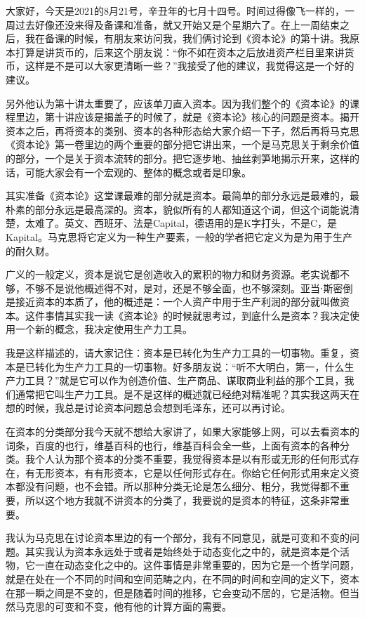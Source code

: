 \documentclass[UTF8, 12pt, a4paper]{ctexrep}
\begin{document}
大家好，今天是2021的8月21号，辛丑年的七月十四号。时间过得像飞一样的，一周过去好像还没来得及备课和准备，就又开始又是个星期六了。在上一周结束之后，我在备课的时候，有朋友来访问我，我们俩讨论到《资本论》的第十讲。我原本打算是讲货币的，后来这个朋友说：“你不如在资本之后放进资产栏目里来讲货币，这样是不是可以大家更清晰一些？”我接受了他的建议，我觉得这是一个好的建议。

另外他认为第十讲太重要了，应该单刀直入资本。因为我们整个的《资本论》的课程里边，第十讲应该是揭盖子的时候了，就是《资本论》核心的问题是资本。揭开资本之后，再将资本的类别、资本的各种形态给大家介绍一下子，然后再将马克思《资本论》第一卷里边的两个重要的部分把它讲出来，一个是马克思关于剩余价值的部分，一个是关于资本流转的部分。把它逐步地、抽丝剥笋地揭示开来，这样的话，可能大家会有一个宏观的、整体的概念或者是印象。

其实准备《资本论》这堂课最难的部分就是资本。最简单的部分永远是最难的，最朴素的部分永远是最高深的。资本，貌似所有的人都知道这个词，但这个词能说清楚，太难了。英文、西班牙、法是Capital，德语用的是K字打头，不是C，是Kapital。马克思将它定义为一种生产要素，一般的学者把它定义为是为用于生产的耐久财。

广义的一般定义，资本是说它是创造收入的累积的物力和财务资源。老实说都不够，不够不是说他概述得不对，是对，还是不够全面，也不够深刻。亚当⋅斯密倒是接近资本的本质了，他的概述是：一个人资产中用于生产利润的部分就叫做资本。这件事情其实我一读《资本论》的时候就思考过，到底什么是资本？我决定使用一个新的概念，我决定使用生产力工具。

我是这样描述的，请大家记住：资本是已转化为生产力工具的一切事物。重复，资本是已转化为生产力工具的一切事物。好多朋友说：“听不大明白，第一，什么生产力工具？”就是它可以作为创造价值、生产商品、谋取商业利益的那个工具，我们通常把它叫生产力工具。是不是这样的概述就已经绝对精准呢？其实我这两天在想的时候，我总是讨论资本问题总会想到毛泽东，还可以再讨论。

在资本的分类部分我今天就不想给大家讲了，如果大家能够上网，可以去看资本的词条，百度的也行，维基百科的也行，维基百科会全一些，上面有资本的各种分类。我个人认为那个资本的分类不重要，我觉得资本是以有形或无形的任何形式存在，有无形资本，有有形资本，它是以任何形式存在。你给它任何形式用来定义资本都没有问题，也不会错。所以那种分类无论是怎么细分、粗分，我觉得都不重要，所以这个地方我就不讲资本的分类了，我要说的是资本的特征，这条非常重要。

我认为马克思在讨论资本里边的有一个部分，我有不同意见，就是可变和不变的问题。其实我认为资本永远处于或者是始终处于动态变化之中的，就是资本是个活物，它一直在动态变化之中的。这件事情是非常重要的，因为它是一个哲学问题，就是在处在一个不同的时间和空间范畴之内，在不同的时间和空间的定义下，资本在那一瞬之间是不变的，但是随着时间的推移，它会变动不居的，它是活物。但当然马克思的可变和不变，他有他的计算方面的需要。
\end{document}

